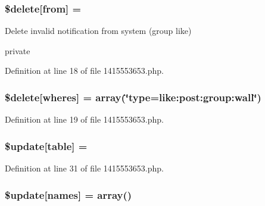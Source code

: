 \subsubsection[{\texorpdfstring{\$delete}{$delete}}]{\setlength{\rightskip}{0pt plus 5cm}\$delete\mbox{[}\textquotesingle{}from\textquotesingle{}\mbox{]} = \textquotesingle{}}\hypertarget{1415553653_8php_ac228c31a229875fce5416792b17c9eee}{}\label{1415553653_8php_ac228c31a229875fce5416792b17c9eee}
Delete invalid notification from system (group like)

private 

Definition at line 18 of file 1415553653.\+php.

\subsubsection[{\texorpdfstring{\$delete}{$delete}}]{\setlength{\rightskip}{0pt plus 5cm}\$delete\mbox{[}\textquotesingle{}wheres\textquotesingle{}\mbox{]} = array(\char`\"{}type=\textquotesingle{}like\+:post\+:group\+:wall\textquotesingle{}\char`\"{})}\hypertarget{1415553653_8php_a9bef9b9c519ccfae44ff986580419667}{}\label{1415553653_8php_a9bef9b9c519ccfae44ff986580419667}


Definition at line 19 of file 1415553653.\+php.

\subsubsection[{\texorpdfstring{\$update}{$update}}]{\setlength{\rightskip}{0pt plus 5cm}\${\bf update}\mbox{[}\textquotesingle{}table\textquotesingle{}\mbox{]} = \textquotesingle{}}\hypertarget{1415553653_8php_aee7ba5985ddf023a93862ab77e9718f9}{}\label{1415553653_8php_aee7ba5985ddf023a93862ab77e9718f9}


Definition at line 31 of file 1415553653.\+php.

\subsubsection[{\texorpdfstring{\$update}{$update}}]{\setlength{\rightskip}{0pt plus 5cm}\${\bf update}\mbox{[}\textquotesingle{}names\textquotesingle{}\mbox{]} = array(\textquotesingle{})}\hypertarget{1415553653_8php_abcf5ad2e4fef35de04bef0168cc91ddc}{}\label{1415553653_8php_abcf5ad2e4fef35de04bef0168cc91ddc}


